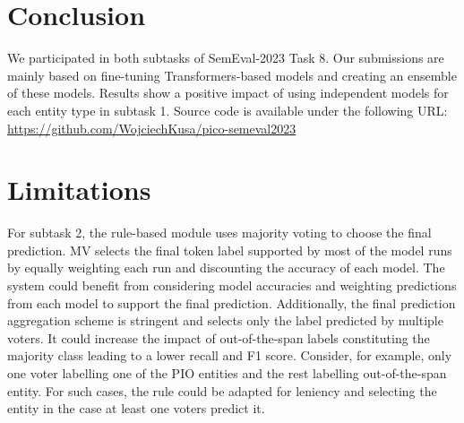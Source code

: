 \documentclass[11pt]{article}
\begin{document}
\section{Conclusion}
%

We participated in both subtasks of SemEval-2023 Task 8.
Our submissions are mainly based on fine-tuning Transformers-based models and creating an ensemble of these models.
Results show a positive impact of using independent models for each entity type in subtask 1.
Source code is available under the following URL: \url{https://github.com/WojciechKusa/pico-semeval2023}
%
%
%
\section*{Limitations}
%
For subtask 2, the rule-based module uses majority voting to choose the final prediction.
MV selects the final token label supported by most of the model runs by equally weighting each run and discounting the accuracy of each model.
The system could benefit from considering model accuracies and weighting predictions from each model to support the final prediction.
Additionally, the final prediction aggregation scheme is stringent and selects only the label predicted by multiple voters.
It could increase the impact of out-of-the-span labels constituting the majority class leading to a lower recall and F1 score.
Consider, for example, only one voter labelling one of the PIO entities and the rest labelling out-of-the-span entity.
For such cases, the rule could be adapted for leniency and selecting the entity in the case at least one voters predict it.
%
%
%


\end{document}
